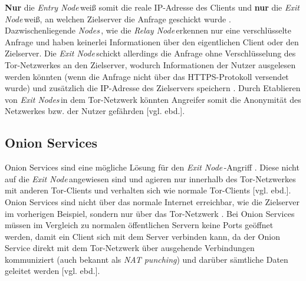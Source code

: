 \documentclass[a4paper,ngerman, headheight=28pt,12pt]{scrartcl}
\newcommand{\vcite}[1]{\cite[vgl.][]{#1}}
\newcommand{\vebd}{[vgl. ebd.]}
\newcommand{\entryn}{\textit{Entry Node\,}}
\newcommand{\relayn}{\textit{Relay Node\,}}
\newcommand{\exitn}{\textit{Exit Node\,}}
\newcommand{\exitns}{\textit{Exit Nodes\,}}
\newcommand{\nodes}{\textit{Nodes\,}}
\begin{document}
\textbf{Nur} die \entryn weiß somit die reale IP-Adresse des Clients und \textbf{nur} die \exitn weiß, an welchen Zielserver die Anfrage geschickt wurde \vcite{TorStructure2}. Dazwischenliegende \nodes, wie die \relayn erkennen nur eine verschlüsselte Anfrage und haben keinerlei Informationen über den eigentlichen Client oder den Zielserver. Die \exitn schickt allerdings die Anfrage ohne Verschlüsselung des Tor-Netzwerkes an den Zielserver, wodurch Informationen der Nutzer ausgelesen werden könnten (wenn die Anfrage nicht über das HTTPS-Protokoll versendet wurde) und zusätzlich die IP-Adresse des Zielservers speichern \vcite{TorExitNodeVulnerability}. Durch Etablieren von \exitns in dem Tor-Netzwerk könnten Angreifer somit die Anonymität des Netzwerkes bzw. der Nutzer gefährden \vebd.

\subsection{Onion Services}
Onion Services sind eine mögliche Lösung für den \exitn-Angriff \vcite{TorOnionServiceTalk}. Diese nicht auf die \exitn angewiesen sind und agieren nur innerhalb des Tor-Netzwerkes mit anderen Tor-Clients und verhalten sich wie normale Tor-Clients \vebd. Onion Services sind nicht über das normale Internet erreichbar, wie die Zielserver im vorherigen Beispiel, sondern nur über das Tor-Netzwerk \vcite{TorOnionService}. Bei Onion Services müssen im Vergleich zu normalen öffentlichen Servern keine Ports geöffnet werden, damit ein Client sich mit dem Server verbinden kann, da der Onion Service direkt mit dem Tor-Netzwerk über ausgehende Verbindungen kommuniziert (auch bekannt als \textit{NAT punching}) und darüber sämtliche Daten geleitet werden \vebd.

\end{document}
